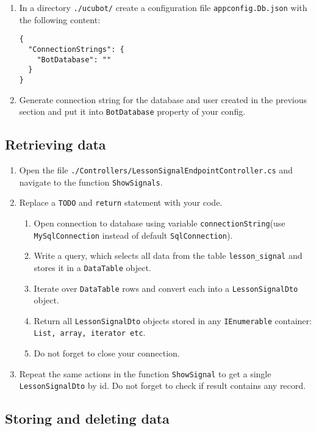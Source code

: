 \documentclass[12pt]{article}
\newcommand{\code}[1]{\texttt{#1}}
\begin{document}
\begin{enumerate}
\item In a directory \code{./ucubot/} create a configuration file \code{appconfig.Db.json} with the following content:
\begin{verbatim}
{
  "ConnectionStrings": {
    "BotDatabase": ""
  }
}
\end{verbatim}
\item Generate connection string for the database and user created in the previous section and put it into \code{BotDatabase} property of your config.
\end{enumerate}

\subsection*{Retrieving data}

\begin{enumerate}
\item Open the file \code{./Controllers/LessonSignalEndpointController.cs} and navigate to the function \code{ShowSignals}.
\item Replace a \code{TODO} and \code{return} statement with your code.
\begin{enumerate}
\item Open connection to database using variable \code{connectionString}(use \code{MySqlConnection} instead of default \code{SqlConnection}).
\item Write a query, which selects all data from the table  \code{lesson\_signal} and stores it in a \code{DataTable} object.
\item Iterate over \code{DataTable} rows and convert each into a \code{LessonSignalDto} object.
\item Return all \code{LessonSignalDto} objects stored in any \code{IEnumerable} container: \code{List, array, iterator etc}.
\item Do not forget to close your connection.
\end{enumerate}
\item Repeat the same actions in the function \code{ShowSignal} to get a single \code{LessonSignalDto} by id. Do not forget to check if result contains any record.
\end{enumerate}

\subsection*{Storing and deleting data}
\end{document}
